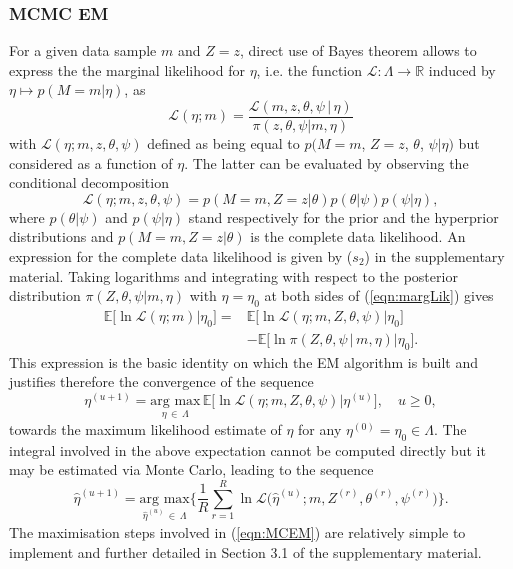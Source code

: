 \documentclass{bioinfo}
\begin{document}
\subsubsection{MCMC EM}\label{sec:MCMCEM}
For a given data sample $m$ and $Z = z$, direct use of Bayes theorem 
allows to  express the the marginal likelihood for $\eta$, i.e. the
function $\mathcal L: \Lambda \to \mathbb R$ induced by $\eta 
\mapsto p(M=m|\eta)$, as
\begin{equation}
  \label{eqn:margLik}
  \mathcal L(\eta; m) 
  = \frac{\mathcal L(m, z, \theta, \psi\,|\,\eta)}{\pi(z,
      \theta, \psi|m, \eta)}
\end{equation}
with $\mathcal L(\eta; m, z, \theta, \psi)$ 
defined as being equal to  $p(M=m$, $Z=z$, $\theta$,
$\psi|\eta)$ but considered as a function of $\eta$.  The latter
can be evaluated by observing the conditional decomposition
\[
   \mathcal L(\eta; m, z, \theta, \psi) 
  = 
   p(M=m, Z=z|\theta) p(\theta|\psi)p(\psi|\eta), 
\]
where $p(\theta|\psi)$ and $p(\psi|\eta)$ stand respectively for the
prior and the hyperprior distributions and $p(M=m, Z=z|\theta)$ is the
complete data likelihood. An expression for the complete data
likelihood is given by ($s_2$) in the supplementary material. Taking
logarithms and integrating with respect to the posterior distribution
$\pi(Z, \theta, \psi|m, \eta)$ with $\eta = \eta_0$ at both sides of
(\ref{eqn:margLik}) gives 
\begin{align*}
   \mathbb E\big[\ln\mathcal L(\eta; m) \big| \eta_0\big] 
  =& 
  \mathbb E\big[\ln\mathcal L(\eta; m, Z, \theta, \psi)
    \big|  \eta_0\big]\\ 
  &-
  \mathbb E\big[\ln \pi(Z, \theta, \psi\,|\,m,\eta)\big| \eta_0\big].
\end{align*}  
This expression is the basic identity on which the EM algorithm is
built and justifies therefore the convergence of the sequence
\begin{equation}
 \label{eqn:EofMCEM}
  \eta^{(u+1)} = \underset{\eta\,\in\, \Lambda}{\text{arg max}}\, 
  \mathbb E\Big[\ln\mathcal L(\eta; m, Z, \theta, \psi)\big|
  \eta^{(u)}\Big], 
  \quad u\geqslant 0,
\end{equation}
towards the maximum likelihood estimate of $\eta$ for any $\eta^{(0)}
= \eta_0  \in \Lambda$. The integral involved in the above expectation
cannot be computed directly but it may be estimated via Monte Carlo,
leading to the sequence 
\begin{equation}
 \label{eqn:MCEM}
   \hat\eta^{(u+1)}
 = 
    \underset{\hat\eta^{(u)}\,\in\,\Lambda}{\text{arg max}} 
   \bigg\{
    \frac{1}{R}\sum_{r=1}^R 
      \ln\mathcal L\Big(\hat\eta^{(u)}; m, Z^{(r)}, \theta^{(r)},
      \psi^{(r)}\Big)
   \bigg\}.
\end{equation}
The maximisation steps involved in (\ref{eqn:MCEM}) are relatively
simple to implement and further detailed in Section 3.1 of the
supplementary material.
\end{document}
